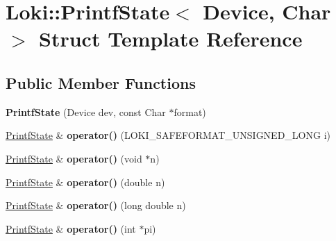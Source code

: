\hypertarget{structLoki_1_1PrintfState}{}\section{Loki\+:\+:Printf\+State$<$ Device, Char $>$ Struct Template Reference}
\label{structLoki_1_1PrintfState}
\subsection*{Public Member Functions}
\begin{DoxyCompactItemize}
\item 
\hypertarget{structLoki_1_1PrintfState_a39f7a9ded102ded1d361656a915f7099}{}{\bfseries Printf\+State} (Device dev, const Char $\ast$format)\label{structLoki_1_1PrintfState_a39f7a9ded102ded1d361656a915f7099}

\item 
\hypertarget{structLoki_1_1PrintfState_a6838348fd683682219298b79a4b2399e}{}\hyperlink{structLoki_1_1PrintfState}{Printf\+State} \& {\bfseries operator()} (L\+O\+K\+I\+\_\+\+S\+A\+F\+E\+F\+O\+R\+M\+A\+T\+\_\+\+U\+N\+S\+I\+G\+N\+E\+D\+\_\+\+L\+O\+N\+G i)\label{structLoki_1_1PrintfState_a6838348fd683682219298b79a4b2399e}

\item 
\hypertarget{structLoki_1_1PrintfState_aa209c856d1f5635a1b083820ee457ac0}{}\hyperlink{structLoki_1_1PrintfState}{Printf\+State} \& {\bfseries operator()} (void $\ast$n)\label{structLoki_1_1PrintfState_aa209c856d1f5635a1b083820ee457ac0}

\item 
\hypertarget{structLoki_1_1PrintfState_a99fb11de54e289f1cc23e6ff952d4140}{}\hyperlink{structLoki_1_1PrintfState}{Printf\+State} \& {\bfseries operator()} (double n)\label{structLoki_1_1PrintfState_a99fb11de54e289f1cc23e6ff952d4140}

\item 
\hypertarget{structLoki_1_1PrintfState_a7444b852ca667041224532897cb76c92}{}\hyperlink{structLoki_1_1PrintfState}{Printf\+State} \& {\bfseries operator()} (long double n)\label{structLoki_1_1PrintfState_a7444b852ca667041224532897cb76c92}

\item 
\hypertarget{structLoki_1_1PrintfState_ad9661e6a0cae450610aba3a2a674a7a1}{}\hyperlink{structLoki_1_1PrintfState}{Printf\+State} \& {\bfseries operator()} (int $\ast$pi)\label{structLoki_1_1PrintfState_ad9661e6a0cae450610aba3a2a674a7a1}


\end{DoxyCompactItemize}
